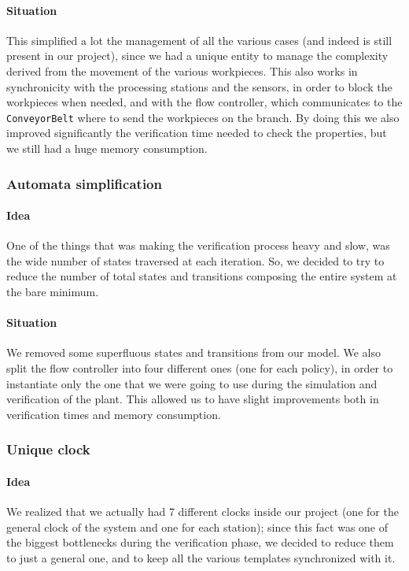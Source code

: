 \documentclass[a4paper,twoside]{article}
\begin{document}
    \paragraph{Situation} This simplified a lot the management of all the various cases (and indeed is still present in our project), since we had a unique entity to manage the complexity derived from the movement of the various workpieces. This also works in synchronicity with the processing stations and the sensors, in order to block the workpieces when needed, and with the flow controller, which communicates to the \texttt{ConveyorBelt} where to send the workpieces on the branch. By doing this we also improved significantly the verification time needed to check the properties, but we still had a huge memory consumption.

    \subsubsection{Automata simplification}

    \paragraph{Idea} One of the things that was making the verification process heavy and slow, was the wide number of states traversed at each iteration. So, we decided to try to reduce the number of total states and transitions composing the entire system at the bare minimum.

    \paragraph{Situation} We removed some superfluous states and transitions from our model. We also split the flow controller into four different ones (one for each policy), in order to instantiate only the one that we were going to use during the simulation and verification of the plant. This allowed us to have slight improvements both in verification times and memory consumption.

    \subsubsection{Unique clock}

    \paragraph{Idea} We realized that we actually had 7 different clocks inside our project (one for the general clock of the system and one for each station); since this fact was one of the biggest bottlenecks during the verification phase, we decided to reduce them to just a general one, and to keep all the various templates synchronized with it.
\end{document}
